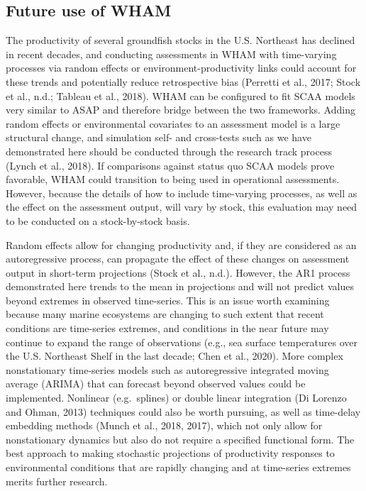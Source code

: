 \documentclass[]{article}
\begin{document}
\hypertarget{future-use-of-wham}{%
\subsection{Future use of WHAM}\label{future-use-of-wham}}

The productivity of several groundfish stocks in the U.S. Northeast has
declined in recent decades, and conducting assessments in WHAM with
time-varying processes via random effects or environment-productivity
links could account for these trends and potentially reduce
retrospective bias (Perretti et al., 2017; Stock et al., n.d.; Tableau
et al., 2018). WHAM can be configured to fit SCAA models very similar to
ASAP and therefore bridge between the two frameworks. Adding random
effects or environmental covariates to an assessment model is a large
structural change, and simulation self- and cross-tests such as we have
demonstrated here should be conducted through the research track process
(Lynch et al., 2018). If comparisons against status quo SCAA models
prove favorable, WHAM could transition to being used in operational
assessments. However, because the details of how to include time-varying
processes, as well as the effect on the assessment output, will vary by
stock, this evaluation may need to be conducted on a stock-by-stock
basis.

Random effects allow for changing productivity and, if they are
considered as an autoregressive process, can propagate the effect of
these changes on assessment output in short-term projections (Stock et
al., n.d.). However, the AR1 process demonstrated here trends to the
mean in projections and will not predict values beyond extremes in
observed time-series. This is an issue worth examining because many
marine ecosystems are changing to such extent that recent conditions are
time-series extremes, and conditions in the near future may continue to
expand the range of observations (e.g., sea surface temperatures over
the U.S. Northeast Shelf in the last decade; Chen et al., 2020). More
complex nonstationary time-series models such as autoregressive
integrated moving average (ARIMA) that can forecast beyond observed
values could be implemented. Nonlinear (e.g.~splines) or double linear
integration (Di Lorenzo and Ohman, 2013) techniques could also be worth
pursuing, as well as time-delay embedding methods (Munch et al., 2018,
2017), which not only allow for nonstationary dynamics but also do not
require a specified functional form. The best approach to making
stochastic projections of productivity responses to environmental
conditions that are rapidly changing and at time-series extremes merits
further research.
\end{document}
